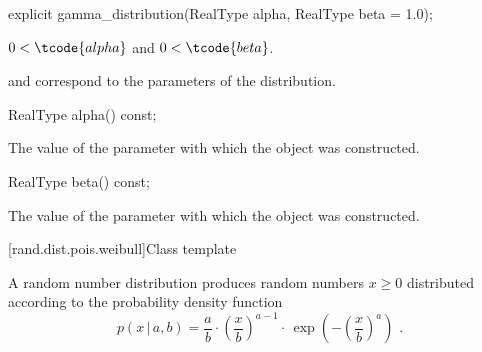 %
\begin{itemdecl}
explicit gamma_distribution(RealType alpha, RealType beta = 1.0);
\end{itemdecl}

\begin{itemdescr}
\pnum
\expects
$0 < \tcode{alpha}$ and $0 < \tcode{beta}$.

\pnum
\remarks
{} and 
correspond to the parameters of the distribution.
\end{itemdescr}

%
\begin{itemdecl}
RealType alpha() const;
\end{itemdecl}

\begin{itemdescr}
\pnum
\returns
The value of the  parameter
 with which the object was constructed.
\end{itemdescr}

%
\begin{itemdecl}
RealType beta() const;
\end{itemdecl}

\begin{itemdescr}
\pnum
\returns
The value of the  parameter
 with which the object was constructed.
\end{itemdescr}


[rand.dist.pois.weibull]{Class template }%
%

\pnum
A  random number distribution
produces random numbers $x \geq 0$
distributed according to
the probability density function%
\[ p(x\,|\,a,b) = \frac{a}{b}
     \cdot \left(\frac{x}{b}\right)^{a-1}
     \cdot \, \exp\left( -\left(\frac{x}{b}\right)^a\right)
     \text{ .} \]

